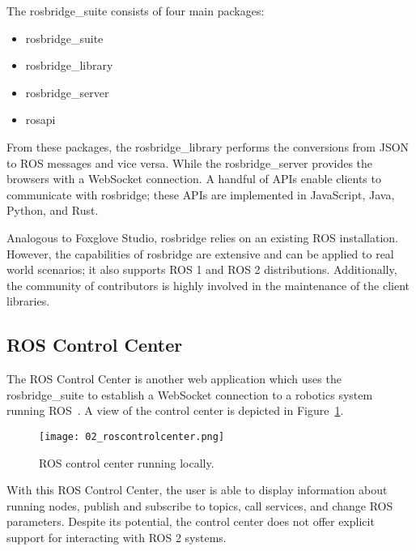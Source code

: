         The \textsf{rosbridge\_suite} consists of four main packages:

        \begin{itemize}
            \item \textsf{rosbridge\_suite}
            \item \textsf{rosbridge\_library}
            \item \textsf{rosbridge\_server}
            \item \textsf{rosapi}
        \end{itemize}

        From these packages, the \textsf{rosbridge\_library} performs the conversions from \ac{JSON} to \ac{ROS} messages and vice versa. While the \textsf{rosbridge\_server} provides the browsers with a WebSocket connection. A handful of \ac{API}s enable clients to communicate with \textsf{rosbridge}; these \ac{API}s are implemented in JavaScript, Java, Python, and Rust.

        Analogous to Foxglove Studio, \textsf{rosbridge} relies on an existing ROS installation. However, the capabilities of \textsf{rosbridge} are extensive and can be applied to real world scenarios; it also supports \ac{ROS} 1 and \ac{ROS} 2 distributions. Additionally, the community of contributors is highly involved in the maintenance of the client libraries.

    \subsection{ROS Control Center}\label{sec:roscontrolcenter}

        The \ac{ROS} Control Center is another web application which uses the \textsf{rosbridge\_suite} to establish a WebSocket connection to a robotics system running \ac{ROS}~\cite{controlcenter}. A view of the control center is depicted in Figure~\ref{fig:roscontrolcenter}.

        \begin{figure}[htbp]
            \centering
            \texttt{[image: 02\_roscontrolcenter.png]}
            \caption{ROS control center running locally.}
            \label{fig:roscontrolcenter}
        \end{figure}

        With this \ac{ROS} Control Center, the user is able to display information about running nodes, publish and subscribe to topics, call services, and change \ac{ROS} parameters. Despite its potential, the control center does not offer explicit support for interacting with \ac{ROS} 2 systems.

